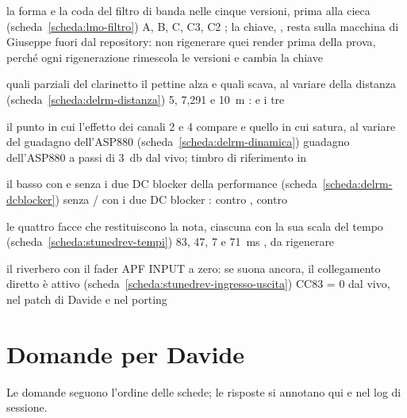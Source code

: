 {la forma e la coda del filtro di banda nelle cinque versioni, prima alla cieca (scheda~\ref{scheda:lmo-filtro})}
{A, B, C, C3, C2}
{; la chiave, , resta sulla macchina di Giuseppe fuori dal repository: non rigenerare quei render prima della prova, perché ogni rigenerazione rimescola le versioni e cambia la chiave}

{quali parziali del clarinetto il pettine alza e quali scava, al variare della distanza (scheda~\ref{scheda:delrm-distanza})}
{5, 7,291 e \qty{10}{\metre}}
{:  e i tre }

{il punto in cui l'effetto dei canali 2 e 4 compare e quello in cui satura, al variare del guadagno dell'ASP880 (scheda~\ref{scheda:delrm-dinamica})}
{guadagno dell'ASP880 a passi di \qty{3}{\decibel}}
{dal vivo; timbro di riferimento in }

{il basso con e senza i due DC blocker della performance (scheda~\ref{scheda:delrm-dcblocker})}
{senza / con i due DC blocker}
{:  contro ,  contro }

{le quattro facce che restituiscono la nota, ciascuna con la sua scala del tempo (scheda~\ref{scheda:stunedrev-tempi})}
{83, 47, 7 e \qty{71}{\milli\second}}
{, da rigenerare}

{il riverbero con il fader APF INPUT a zero: se suona ancora, il collegamento diretto è attivo (scheda~\ref{scheda:stunedrev-ingresso-uscita})}
{CC83 = 0}
{dal vivo, nel patch di Davide e nel porting}

\chapter{Domande per Davide}\label{cap:domande}
Le domande seguono l'ordine delle schede; le risposte si annotano qui e nel log di sessione.


